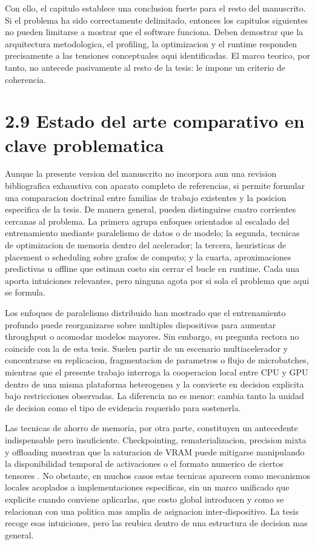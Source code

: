 Con ello, el capitulo establece una conclusion fuerte para el resto del manuscrito. Si el problema ha sido correctamente delimitado, entonces los capitulos siguientes no pueden limitarse a mostrar que el software funciona. Deben demostrar que la arquitectura metodologica, el profiling, la optimizacion y el runtime responden precisamente a las tensiones conceptuales aqui identificadas. El marco teorico, por tanto, no antecede pasivamente al resto de la tesis: le impone un criterio de coherencia.

\section{2.9 Estado del arte comparativo en clave problematica}
Aunque la presente version del manuscrito no incorpora aun una revision bibliografica exhaustiva con aparato completo de referencias, si permite formular una comparacion doctrinal entre familias de trabajo existentes y la posicion especifica de la tesis. De manera general, pueden distinguirse cuatro corrientes cercanas al problema. La primera agrupa enfoques orientados al escalado del entrenamiento mediante paralelismo de datos o de modelo; la segunda, tecnicas de optimizacion de memoria dentro del acelerador; la tercera, heuristicas de placement o scheduling sobre grafos de computo; y la cuarta, aproximaciones predictivas u offline que estiman costo sin cerrar el bucle en runtime. Cada una aporta intuiciones relevantes, pero ninguna agota por si sola el problema que aqui se formula.

Los enfoques de paralelismo distribuido han mostrado que el entrenamiento profundo puede reorganizarse sobre multiples dispositivos para aumentar throughput o acomodar modelos mayores. Sin embargo, su pregunta rectora no coincide con la de esta tesis. Suelen partir de un escenario multiacelerador y concentrarse en replicacion, fragmentacion de parametros o flujo de microbatches, mientras que el presente trabajo interroga la cooperacion local entre CPU y GPU dentro de una misma plataforma heterogenea y la convierte en decision explicita bajo restricciones observadas. La diferencia no es menor: cambia tanto la unidad de decision como el tipo de evidencia requerido para sostenerla.

Las tecnicas de ahorro de memoria, por otra parte, constituyen un antecedente indispensable pero insuficiente. Checkpointing, rematerializacion, precision mixta y offloading muestran que la saturacion de VRAM puede mitigarse manipulando la disponibilidad temporal de activaciones o el formato numerico de ciertos tensores \cite{griewank2000revolve,chen2016sublinear,rajbhandari2020zero,ren2021zerooffload}. No obstante, en muchos casos estas tecnicas aparecen como mecanismos locales acoplados a implementaciones especificas, sin un marco unificado que explicite cuando conviene aplicarlas, que costo global introducen y como se relacionan con una politica mas amplia de asignacion inter-dispositivo. La tesis recoge esas intuiciones, pero las reubica dentro de una estructura de decision mas general.

